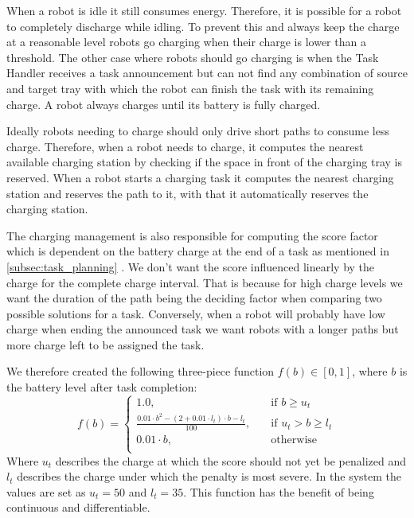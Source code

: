 \documentclass[journal]{IEEEtran}
\newcommand{\compref}[1]{\autoref{#1} \nameref{#1}}
\begin{document}
When a robot is idle it still consumes energy. Therefore, it is possible for a robot to completely discharge while idling. 
To prevent this and always keep the charge at a reasonable level robots go charging when their charge is lower than a threshold.
The other case where robots should go charging is when the Task Handler receives a task announcement but can not find any combination of source and target tray with which the robot can finish the task with its remaining charge.
A robot always charges until its battery is fully charged.

Ideally robots needing to charge should only drive short paths to consume less charge. 
Therefore, when a robot needs to charge, it computes the nearest available charging station by checking if the space in front of the charging tray is reserved.
When a robot starts a charging task it computes the nearest charging station and reserves the path to it, with that it automatically reserves the charging station.

The charging management is also responsible for computing the score factor which is dependent on the battery charge at the end of a task as mentioned in \compref{subsec:task_planning}.
We don't want the score influenced linearly by the charge for the complete charge interval. 
That is because for high charge levels we want the duration of the path being the deciding factor when comparing two possible solutions for a task.
Conversely, when a robot will probably have low charge when ending the announced task we want robots with a longer paths but more charge left to be assigned the task.

We therefore created the following three-piece function $f(b) \in [0, 1]$, where $b$ is the battery level after task completion:
\[ 
f(b) = 
	\begin{cases}
		1.0,&\quad \text{if } b \geq u_t \\
		\frac{0.01 \cdot b^2 - (2 + 0.01 \cdot l_t) \cdot b - l_t}{100}, &\quad \text{if } u_t > b \geq l_t \\
		0.01 \cdot b, &\quad \text{otherwise} \\
	\end{cases}
\]
Where $u_t$ describes the charge at which the score should not yet be penalized and $l_t$ describes the charge under which the penalty is most severe.
In the system the values are set as $u_t = 50$ and $l_t = 35$.
This function has the benefit of being continuous and differentiable.
\end{document}
